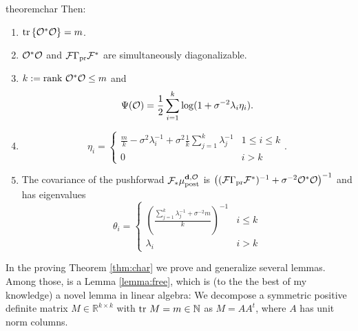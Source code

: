 \begin{restatable}{theorem}{char}
  Then:
  \begin{enumerate}
  \item  \(\textup{tr}\left \{\mathcal{O}^*\mathcal{O} \right \} = m\).
  \item \(\mathcal{O}^*\mathcal{O}\) and \(\mathcal{F}\Gamma_{\textup{pr}}\mathcal{F}^*\) are simultaneously
    diagonalizable.
  \item \(k := \textup{rank}\  \mathcal{O}^*\mathcal{O} \leq m\) and
    \begin{equation*}
      \tar(\obs) = \frac12 \sum_{i=1}^{k} \log (1 + \sigma^{-2}\lambda_i\eta_i). %
    \end{equation*}
  \item
    \begin{equation*}
        \eta_i = \begin{cases}
          \frac{m}{k} - \sigma^2 \lambda_i^{-1} + \sigma^2 \frac{1}{k} \sum_{j=1}^k \lambda_j^{-1} & 1 \leq i \leq k \\
          0 & i > k 
        \end{cases}.
    \end{equation*}
  \item The covariance of the pushforwad \(\mathcal{F}_{*} \mu_{\textup{post}}^{\mathbf{d}, \mathcal{O}}\) is \(\left (
    (\mathcal{F} \Gamma_{\textup{pr}} \mathcal{F}^*)^{-1} + \sigma^{-2} \mathcal{O}^*\mathcal{O} \right )^{-1}\)
    and has eigenvalues
    \begin{equation*}
      \theta_i =
      \begin{cases}
        \left(\frac{\sum_{j=1}^k \lambda_j^{-1} + \sigma^{-2}m}{k} \right )^{-1} & i \leq k \\
        \lambda_i &  i > k 
      \end{cases}
    \end{equation*}
  \end{enumerate}
\end{restatable}

In the proving Theorem \ref{thm:char} we prove and generalize several
lemmas. Among those, is a Lemma \ref{lemma:free}, which is (to the the
best of my knowledge) a novel lemma in linear algebra: We decompose a
symmetric positive definite matrix \(M \in \mathbb{R}^{k \times k}\)
with \(\textup{tr}\ M = m \in \mathbb{N}\) as \(M = AA^t\), where \(A\) has unit
norm columns.


